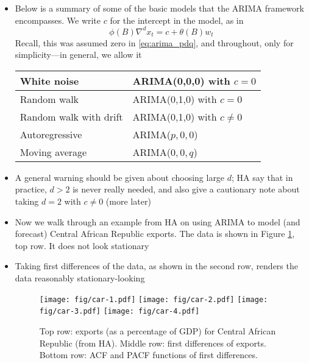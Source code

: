 \documentclass{article}
\begin{document}
\begin{itemize}
\item Below is a summary of some of the basic models that the ARIMA framework
  encompasses. We write $c$ for the intercept in the model, as in 
  \begin{equation}
  \label{eq:arima_pdq_c}
  \phi(B) \nabla^d x_t = c + \theta(B) w_t
  \end{equation}
  Recall, this was assumed zero in \eqref{eq:arima_pdq}, and throughout, only
  for simplicity---in general, we allow it 

  \begin{center} \smallskip
  \begin{tabular}{|l|l|}
  \hline
  White noise & ARIMA(0,0,0) with $c=0$ \\
  \hline
  Random walk & ARIMA(0,1,0) with $c=0$ \\
  \hline 
  Random walk with drift & ARIMA(0,1,0) with $c \not= 0$ \\
  \hline
  Autoregressive & ARIMA($p,0,0$) \\
  \hline
  Moving average & ARIMA($0,0,q$) \\
  \hline
  \end{tabular} \smallskip
  \end{center}

\item A general warning should be given about choosing large $d$; HA say that in
  practice, $d > 2$ is never really needed, and also give a cautionary note
  about taking $d = 2$ with $c \not= 0$ (more later)

\item Now we walk through an example from HA on using ARIMA to model (and
  forecast) Central African Republic exports. The data is shown in Figure
  \ref{fig:car_exploratory}, top row. It does not look stationary  

\item Taking first differences of the data, as shown in the second row, renders
  the data reasonably stationary-looking 

\begin{figure}[p]
\centering
\texttt{[image: fig/car-1.pdf]}
\texttt{[image: fig/car-2.pdf]}
\texttt{[image: fig/car-3.pdf]}
\texttt{[image: fig/car-4.pdf]}
\caption{Top row: exports (as a percentage of GDP) for Central African
  Republic (from HA). Middle row: first differences of exports. Bottom row: ACF 
  and PACF functions of first differences.}
\label{fig:car_exploratory}
\end{figure}


\end{itemize}
\end{document}
